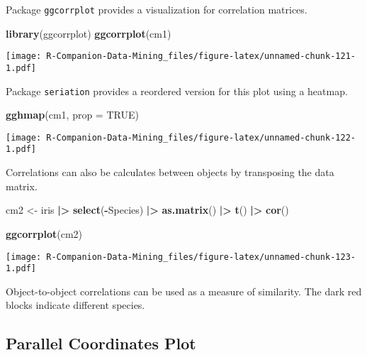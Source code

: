 \documentclass[
  notitlepage]{book}
\newenvironment{Shaded}{\begin{snugshade}}{\end{snugshade}}
\newcommand{\DataTypeTok}[1]{\textcolor[rgb]{0.13,0.29,0.53}{#1}}
\newcommand{\ErrorTok}[1]{\textcolor[rgb]{0.64,0.00,0.00}{\textbf{#1}}}
\newcommand{\KeywordTok}[1]{\textcolor[rgb]{0.13,0.29,0.53}{\textbf{#1}}}
\newcommand{\NormalTok}[1]{#1}
\newcommand{\OperatorTok}[1]{\textcolor[rgb]{0.81,0.36,0.00}{\textbf{#1}}}
\newcommand{\OtherTok}[1]{\textcolor[rgb]{0.56,0.35,0.01}{#1}}
\newcommand{\StringTok}[1]{\textcolor[rgb]{0.31,0.60,0.02}{#1}}
\begin{document}
Package \texttt{ggcorrplot} provides a visualization for correlation matrices.

\begin{Shaded}
\begin{Highlighting}[]
\KeywordTok{library}\NormalTok{(ggcorrplot)}
\KeywordTok{ggcorrplot}\NormalTok{(cm1)}
\end{Highlighting}
\end{Shaded}

\texttt{[image: R-Companion-Data-Mining\_files/figure-latex/unnamed-chunk-121-1.pdf]}

Package \texttt{seriation} provides a reordered version for this plot using a
heatmap.

\begin{Shaded}
\begin{Highlighting}[]
\KeywordTok{gghmap}\NormalTok{(cm1, }\DataTypeTok{prop =} \OtherTok{TRUE}\NormalTok{)}
\end{Highlighting}
\end{Shaded}

\texttt{[image: R-Companion-Data-Mining\_files/figure-latex/unnamed-chunk-122-1.pdf]}

Correlations can also be calculates between objects by transposing the
data matrix.

\begin{Shaded}
\begin{Highlighting}[]
\NormalTok{cm2 \textless{}{-}}\StringTok{ }\NormalTok{iris }\OperatorTok{|}\ErrorTok{\textgreater{}}\StringTok{ }
\StringTok{  }\KeywordTok{select}\NormalTok{(}\OperatorTok{{-}}\NormalTok{Species) }\OperatorTok{|}\ErrorTok{\textgreater{}}\StringTok{ }
\StringTok{  }\KeywordTok{as.matrix}\NormalTok{() }\OperatorTok{|}\ErrorTok{\textgreater{}}\StringTok{ }
\StringTok{  }\KeywordTok{t}\NormalTok{() }\OperatorTok{|}\ErrorTok{\textgreater{}}\StringTok{ }
\StringTok{  }\KeywordTok{cor}\NormalTok{()}

\KeywordTok{ggcorrplot}\NormalTok{(cm2)}
\end{Highlighting}
\end{Shaded}

\texttt{[image: R-Companion-Data-Mining\_files/figure-latex/unnamed-chunk-123-1.pdf]}

Object-to-object correlations can be used as a measure of similarity.
The dark red blocks indicate different species.

\hypertarget{parallel-coordinates-plot}{%
\subsection{Parallel Coordinates Plot}\label{parallel-coordinates-plot}}
\end{document}
